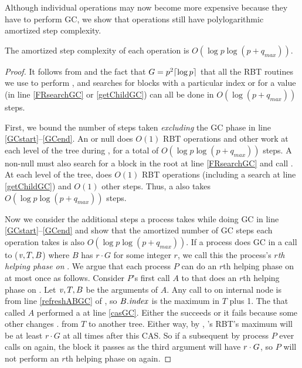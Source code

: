 
Although individual operations may now become more expensive because they have to perform GC,
we show that operations still have polylogarithmic amortized step complexity.

\begin{mytheorem}
The amortized step complexity of each operation is $O(\log p \log(p+q_{max}))$.
\end{mytheorem}
\begin{proof}
It follows from  and the fact that $G=p^2\lceil \log p \rceil$
that all the RBT routines we use to perform ,  and searches for
blocks with a particular index or for a  value (in line \ref{FRsearchGC} or \ref{getChildGC}) can all be done in $O(\log(p+q_{max}))$ steps.

First, we bound the number of steps taken \emph{excluding} the GC phase in line \ref{GCstart}--\ref{GCend}.
An  or null  does $O(1)$ RBT operations and other work at each level of the tree during ,
for a total of $O(\log p \log(p+q_{max}))$ steps.
A non-null  must also search for a block in the root at line \ref{FRsearchGC}
and call .  At each level of the tree,  does $O(1)$ RBT operations (including a search at line \ref{getChildGC}) and $O(1)$ other steps.
Thus, a  also takes $O(\log p \log(p+q_{max}))$ steps.

Now we consider the additional steps a process takes while doing GC in line \ref{GCstart}--\ref{GCend}
and show that the amortized number of GC steps each operation takes is also $O(\log p\log(p+q_{max}))$.
If a process does GC in a call to ($\mbox{\textnormal{\textit{v}}},T,B$) where $B$ has  $r\cdot G$ for some integer $r$, we call this the process's \emph{$r$th helping phase on }.
We argue that each process $P$ can do an $r$th helping phase on  at most once as follows.
Consider $P$'s first call $A$ to  that does an $r$th helping phase on .
Let $\mbox{\textnormal{\textit{v}}},T,B$ be the arguments of $A$.
Any call to  on internal node  is from line \ref{refreshABGC} of , so $B.\mbox{\textit{index}}$
is the maximum  in $T$ plus 1.
The  that called $A$ performed a  at line \ref{casGC}.  Either the  succeeds
or it fails because 
some other  changes . from $T$ to another tree.
Either way, by , 's RBT's maximum  will be at least $r\cdot G$ at all times
after this CAS.
So if a subsequent  by process $P$ 
ever calls  on  again, the block it passes as the third argument
will have $\index>r\cdot G$, so $P$ will not perform an $r$th helping phase on  again.


\end{proof}
